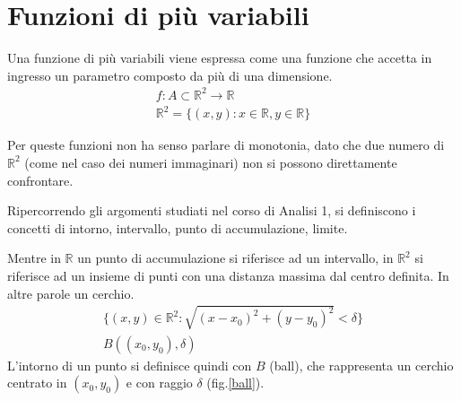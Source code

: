 
\def \varTitle {Funzioni di pi\`u variabili}
\def \varAuthors {Mc128k}
\def \varSubject {}
\def \varKeywords {}
\def \varCopyright {\textcopyright \  \the\year \  Mc128k}
\def \varDate {2015-10-14}
\def \varAbstractTitle {Contenuti}
\def \varAbstractContents {}
\def \varPaperType {a4paper}
\def \varImagesPath {./_Images/}



  \maketitle \renewcommand{\abstractname}{\varAbstractTitle} \begin{abstract} \varAbstractContents \end{abstract} \tableofcontents \pagebreak \graphicspath{{\varImagesPath}}

\section{Funzioni di più variabili}

Una funzione di più variabili viene espressa come una funzione che accetta in ingresso un parametro composto da più di una dimensione.
\begin{gather}
	f:A\subset\mathbb{R}^2\rightarrow\mathbb{R} \\
	\mathbb{R}^2=\{(x, y) : x\in \mathbb{R}, y\in \mathbb{R}\}
\end{gather}

\begin{observation}
Per queste funzioni non ha senso parlare di monotonia, dato che due numero di $\mathbb{R}^2$ (come nel caso dei numeri immaginari) non si possono direttamente confrontare.	
\end{observation}

Ripercorrendo gli argomenti studiati nel corso di Analisi 1, si definiscono i concetti di intorno, intervallo, punto di accumulazione, limite.

\begin{definition}
	Mentre in $\mathbb{R}$ un punto di accumulazione si riferisce ad un intervallo, in $\mathbb{R}^2$ si riferisce ad un insieme di punti con una distanza massima dal centro definita. In altre parole un cerchio.
	\begin{gather}
		\{(x, y)\in \mathbb{R}^2 : \sqrt{(x-x_0)^2+(y-y_0)^2}<\delta\} \\
		B((x_0, y_0), \delta)
	\end{gather}
	L'intorno di un punto si definisce quindi con $B$ (ball), che rappresenta un cerchio centrato in $(x_0, y_0)$ e con raggio $\delta$ (fig.\ref{ball}).
\end{definition}

